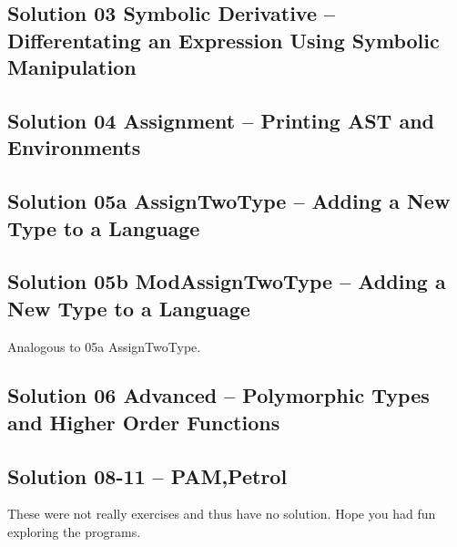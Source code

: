 \documentclass[10pt,a4]{article}
\begin{document}
\subsection*{Solution 03 Symbolic Derivative –  Differentating an Expression Using Symbolic Manipulation}


\subsection*{Solution 04 Assignment – Printing AST and Environments}


\subsection*{Solution 05a AssignTwoType – Adding a New Type to a Language}


\subsection*{Solution 05b ModAssignTwoType – Adding a New Type to a Language}
Analogous to 05a AssignTwoType.

\subsection*{Solution 06 Advanced – Polymorphic Types and Higher Order Functions}


\subsection*{Solution 08-11 – PAM,Petrol}
These were not really exercises and thus have no solution. Hope you had fun exploring the programs.
\end{document}
